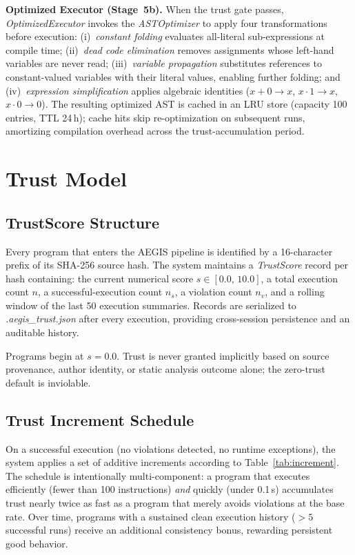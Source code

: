 \documentclass[conference]{IEEEtran}
\begin{document}
\textbf{Optimized Executor (Stage~5b).} When the trust gate
passes, \textit{OptimizedExecutor} invokes the
\textit{ASTOptimizer} to apply four
transformations before execution: (i)~\emph{constant folding}
evaluates all-literal sub-expressions at compile time; (ii)~\emph{dead
code elimination} removes assignments whose left-hand variables are
never read; (iii)~\emph{variable propagation} substitutes
references to constant-valued variables with their literal values,
enabling further folding; and (iv)~\emph{expression simplification}
applies algebraic identities ($x+0\to x$, $x\cdot1\to x$,
$x\cdot0\to0$). The resulting optimized AST is cached in an LRU
store (capacity 100 entries, TTL 24\,h); cache hits skip
re-optimization on subsequent runs, amortizing compilation overhead
across the trust-accumulation period.

\section{Trust Model}
\label{sec:trust}

\subsection{TrustScore Structure}

Every program that enters the AEGIS pipeline is identified by a
16-character prefix of its SHA-256 source hash. The system maintains
a \textit{TrustScore} record per hash containing: the current
numerical score $s \in [0.0,\,10.0]$, a total execution count $n$,
a successful-execution count $n_s$, a violation count $n_v$, and a
rolling window of the last 50 execution summaries. Records are
serialized to \textit{.aegis\_trust.json} after every execution,
providing cross-session persistence and an auditable history.

Programs begin at $s = 0.0$. Trust is never granted implicitly
based on source provenance, author identity, or static analysis
outcome alone; the zero-trust default is inviolable.

\subsection{Trust Increment Schedule}

On a successful execution (no violations detected, no runtime
exceptions), the system applies a set of additive increments
according to Table~\ref{tab:increment}. The schedule is intentionally
multi-component: a program that executes efficiently (fewer than 100
instructions) \emph{and} quickly (under 0.1\,s) accumulates trust
nearly twice as fast as a program that merely avoids violations at
the base rate. Over time, programs with a sustained clean execution
history ($> 5$ successful runs) receive an additional consistency
bonus, rewarding persistent good behavior.
\end{document}
